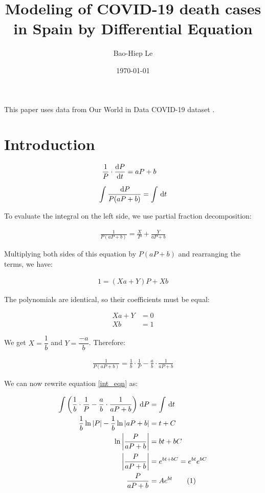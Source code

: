 \documentclass[12pt]{article}
\title{Modeling of COVID-19 death cases in Spain by Differential Equation}
\author{Bao-Hiep Le}
\date{\today}
\newcommand{\abs}[1]{\left | #1 \right |}
\newcommand\numberthis{\addtocounter{equation}{1}\tag{\theequation}}
\begin{document}
\maketitle


This paper uses data from Our World in Data COVID-19 dataset \autocite{owid-covid-data}.
\section*{Introduction}

\begin{align*}
\frac{1}{P} \cdot \diff{P}{t} &= aP + b
\end{align*}

\begin{equation} \label{int_eqn}
\int \frac{\dl{P}}{P(aP + b)} = \int \dl{t}
\end{equation}

To evaluate the integral on the left side, we use partial fraction decomposition:

\begin{align*}
\frac{1}{P(aP + b)} = \frac{X}{P} + \frac{Y}{aP + b}
\end{align*}

Multiplying both sides of this equation by $P(aP + b)$ and rearranging the terms, we have:

\begin{align*}
1 = (Xa + Y)P + Xb
\end{align*}

The polynomials are identical, so their coefficients must be equal:

\begin{align*}
Xa + Y &= 0 \\
Xb &= 1
\end{align*}

We get $X = \dfrac{1}{b}$ and $Y = \dfrac{-a}{b}$. Therefore:

\begin{align*}
\frac{1}{P(aP + b)} = \frac{1}{b} \cdot \frac{1}{P} - \frac{a}{b} \cdot \frac{1}{aP + b}
\end{align*}

We can now rewrite equation \ref{int_eqn} as:

\begin{align*}
\int \left ( \frac{1}{b} \cdot \frac{1}{P} - \frac{a}{b} \cdot \frac{1}{aP + b} \right ) \dl{P} &= \int \dl{t} \\
\frac{1}{b} \ln \abs{P} - \frac{1}{b} \ln \abs{aP + b} &= t + C \\
\ln \abs{\frac{P}{aP + b}} &= bt + bC \\
\abs{\frac{P}{aP + b}} &= e^{bt + bC} = e^{bt}e^{bC} \\
\frac{P}{aP + b} &= Ae^{bt} \numberthis \label{int2_eqn}
\end{align*}
\end{document}
